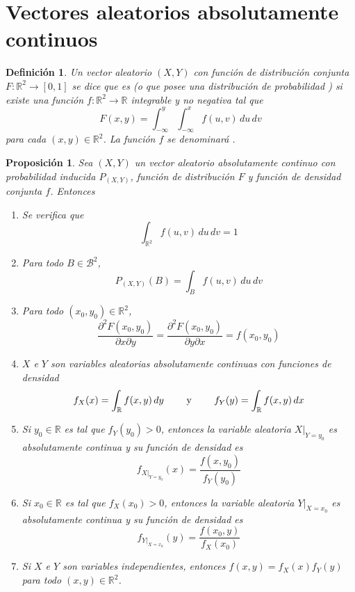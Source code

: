 \documentclass[11pt]{report}
\theoremstyle{mytheorem}
\newtheorem{proposition}{Proposición}
\theoremstyle{mydefinition}
\newtheorem{definition}{Definición}
\theoremstyle{myexample}
\newenvironment{cdefinition} %
  {\begin{mdframed}[
        linewidth=3pt,
        linecolor=c1,
        bottomline=false,
        topline=false,
        rightline=false,
        innerrightmargin=0pt,
        innertopmargin=0pt,
        innerbottommargin=0pt,
        innerleftmargin=1em,
        skipabove=\baselineskip]
    \begin{definition}}
  {\end{definition}\end{mdframed}}
\newenvironment{cproposition} %
  {\begin{mdframed}[
        linewidth=3pt,
        linecolor=c2,
        bottomline=false,
        topline=false,
        rightline=false,
        innerrightmargin=0pt,
        innertopmargin=0pt,
        innerbottommargin=0pt,
        innerleftmargin=1em,
        skipabove=\baselineskip]
    \begin{proposition}}
  {\end{proposition}\end{mdframed}}
\newcommand{\R}{\mathbb R}
\newcommand{\mybf}[1]{\boldmath\textbf{\color{c1}#1}\unboldmath} %
\begin{document}
\section{Vectores aleatorios absolutamente continuos}

\begin{cdefinition}
Un vector aleatorio $(X,Y)$ con función de distribución conjunta $F \colon \R^2 \to [0,1]$ se dice que es \mybf{{absolutamente continuo}} (o que posee una distribución de probabilidad \mybf{{absolutamente continua}}) si existe una función $f \colon \R^2 \to \R$ integrable y no negativa tal que
\[F(x,y) = \int_{-\infty}^y\int_{-\infty}^xf(u,v) \,du \, dv\]
para cada $(x,y) \in \R^2$. La función $f$ se denominará \mybf{{función de densidad conjunta}}.
\end{cdefinition}

\begin{cproposition}
Sea $(X,Y)$ un vector aleatorio absolutamente continuo con probabilidad inducida $P_{(X,Y)}$, función de distribución $F$ y función de densidad conjunta $f$. Entonces
\begin{enumerate}
    \item Se verifica que
    \[\int_{\R^2} f(u,v) \, du \, dv = 1\]
    \item Para todo $B \in \mathcal{B}^2$,
    \[P_{(X,Y)}(B)=\int_Bf(u,v)\, du \, dv\]
    \item Para todo $(x_0,y_0) \in \R^2$,
    \[\frac{\partial^2F(x_0,y_0)}{\partial x \partial y} = \frac{\partial^2F(x_0,y_0)}{\partial y \partial x} = f(x_0,y_0)\]
    \item $X$ e $Y$ son variables aleatorias absolutamente continuas con funciones de densidad
    \[f_X(x) = \int_\R f(x,y)\,dy \qquad \textup{ y } \qquad f_Y(y) = \int_\R f(x,y) \, dx\]
    \item Si $y_0 \in \R$ es tal que $f_Y(y_0) > 0$, entonces la variable aleatoria $X |_{Y=y_0}$ es absolutamente continua y su función de densidad es
    \[f_{X|_{Y=y_0}}(x) = \frac{f(x,y_0)}{f_Y(y_0)}\]
    \item Si $x_0 \in \R$ es tal que $f_X(x_0) > 0$, entonces la variable aleatoria $Y |_{X=x_0}$ es absolutamente continua y su función de densidad es
    \[f_{Y|_{X=x_0}}(y) = \frac{f(x_0,y)}{f_X(x_0)}\]
    \item Si $X$ e $Y$ son variables independientes, entonces $f(x,y) = f_X(x)f_Y(y)$ para todo $(x,y) \in \R^2$.
\end{enumerate}
\end{cproposition}
\end{document}
